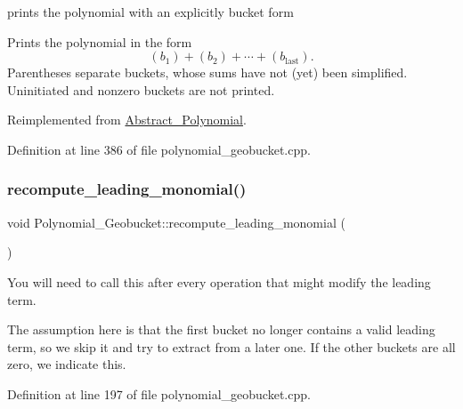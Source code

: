 prints the polynomial with an explicitly bucket form 

Prints the polynomial in the form \[(b_1) + (b_2) + \cdots + (b_\textrm{last}).\] Parentheses separate buckets, whose sums have not (yet) been simplified. Uninitiated and nonzero buckets are not printed. 

Reimplemented from \hyperlink{class_abstract___polynomial}{Abstract\+\_\+\+Polynomial}.



Definition at line 386 of file polynomial\+\_\+geobucket.\+cpp.

\mbox{\label{class_polynomial___geobucket_ab57dbe8d5f0d3860997775d9f354ab0c}} 
\subsubsection{\texorpdfstring{recompute\+\_\+leading\+\_\+monomial()}{recompute\_leading\_monomial()}}
{\footnotesize\ttfamily void Polynomial\+\_\+\+Geobucket\+::recompute\+\_\+leading\+\_\+monomial (\begin{DoxyParamCaption}{ }\end{DoxyParamCaption})\hspace{0.3cm}{\ttfamily [virtual]}}



You will need to call this after every operation that might modify the leading term. 

The assumption here is that the first bucket no longer contains a valid leading term, so we skip it and try to extract from a later one. If the other buckets are all zero, we indicate this. 

Definition at line 197 of file polynomial\+\_\+geobucket.\+cpp.

\mbox{\label{class_polynomial___geobucket_a77030f8f042b33358d74012f039f69e4}} 
